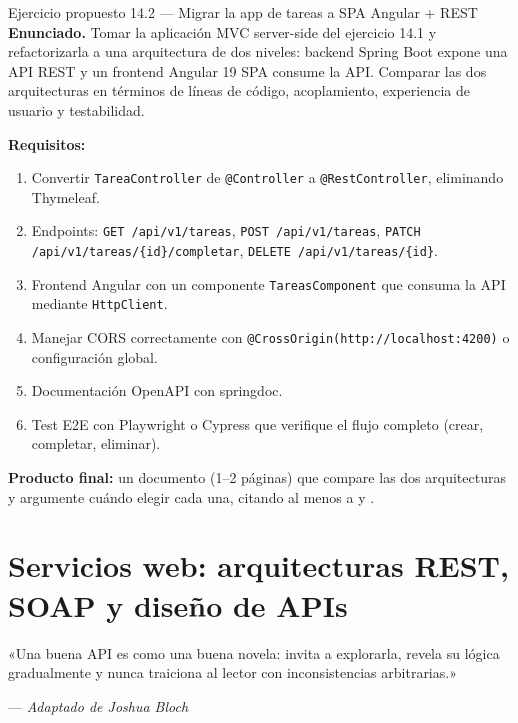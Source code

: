 \documentclass[11pt,a4paper,openany]{book}
\begin{document}
\begin{cajaejercicio}{Ejercicio propuesto 14.2 --- Migrar la app de tareas a SPA Angular + REST}
\textbf{Enunciado.} Tomar la aplicación MVC server-side del ejercicio
14.1 y refactorizarla a una arquitectura de dos niveles: backend Spring
Boot expone una API REST y un frontend Angular 19 SPA consume la API.
Comparar las dos arquitecturas en términos de líneas de código,
acoplamiento, experiencia de usuario y testabilidad.

\textbf{Requisitos:}
\begin{enumerate}
\item Convertir \texttt{TareaController} de \texttt{@Controller} a
\texttt{@RestController}, eliminando Thymeleaf.
\item Endpoints: \texttt{GET /api/v1/tareas},
\texttt{POST /api/v1/tareas}, \texttt{PATCH /api/v1/tareas/\{id\}/completar},
\texttt{DELETE /api/v1/tareas/\{id\}}.
\item Frontend Angular con un componente \texttt{TareasComponent}
que consuma la API mediante \texttt{HttpClient}.
\item Manejar CORS correctamente con
\texttt{@CrossOrigin(http://localhost:4200)} o configuración
global.
\item Documentación OpenAPI con springdoc.
\item Test E2E con Playwright o Cypress que verifique el flujo
completo (crear, completar, eliminar).
\end{enumerate}

\textbf{Producto final:} un documento (1--2 páginas) que compare las
dos arquitecturas y argumente cuándo elegir cada una, citando al
menos a \cite{galloway2011mvc} y \cite{richardson2007restful}.
\end{cajaejercicio}

\chapter{Servicios web: arquitecturas REST, SOAP y diseño de APIs}
\label{cap:semana15}

\epigraph{«Una buena API es como una buena novela: invita a explorarla,
revela su lógica gradualmente y nunca traiciona al lector con
inconsistencias arbitrarias.»}{--- \textit{Adaptado de Joshua Bloch}}
\end{document}
